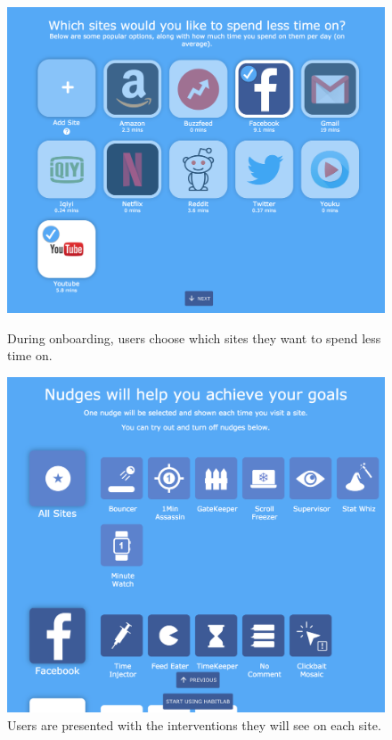 \begin{figure}
\begin{minipage}[t]{0.49\linewidth}
\includegraphics[width=\linewidth]{figures/onboarding_sites}
\caption{During onboarding, users choose which sites they want to spend less time on.}
  \label{fig:onboarding_sites}
\end{minipage}
\hfill
\begin{minipage}[t]{0.49\linewidth}
\includegraphics[width=\linewidth]{figures/onboarding_nudges_short}
\caption{Users are presented with the interventions they will see on each site.}
  \label{fig:onboarding_nudges}
\end{minipage}%
\end{figure}


